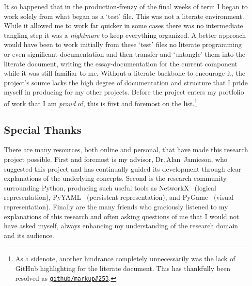 It so happened that \Dash in the production-frenzy of the final weeks of term \Dash
  I began to work solely from what began as a \enquote*{test} file.
This was not a literate environment.
While it allowed me to work far quicker in some cases
  \Dash there was no intermediate tangling step \Dash
  it was a \emph{nightmare} to keep everything organized.
A better approach would have been to work initially from these \enquote*{test} files \Dash
  no literate programming or even significant documentation \Dash
  and then transfer and \enquote*{untangle} them into the literate document,
  writing the essay-documentation for the current component while it was still familiar to me.
Without a literate backbone to encourage it, the project's source lacks the high degree of
  documentation and structure that I pride myself in producing for my other projects.
Before the project enters my portfolio of work that I am \emph{proud} of,
  this is first and foremost on the list.\footnote{%
    As a sidenote, another hindrance \Dash completely unnecessarily \Dash
    was the lack of GitHub highlighting for the literate document.
    This has thankfully been resolved as \href{https://github.com/github/markup/issues/253}{\texttt{github/markup\#253}}.}


\subsection{Special Thanks}
There are many resources, both online and personal, that have made this research project possible.
First and foremost is my advisor, Dr.\,Alan~Jamieson, who suggested this project
  and has continually guided its development through clear explanations of the underlying concepts.
Second is the research community surrounding Python, producing such useful tools
  as NetworkX~\autocite{hagberg:networkx} (logical representation),
  PyYAML~\autocite{pyyaml} (persistent representation), and
  PyGame~\autocite{pygame} (visual representation).
Finally are the many friends who graciously listened to my explanations of this research
  and often asking questions of me that I would not have asked myself,
  always enhancing my understanding of the research domain and its audience.

